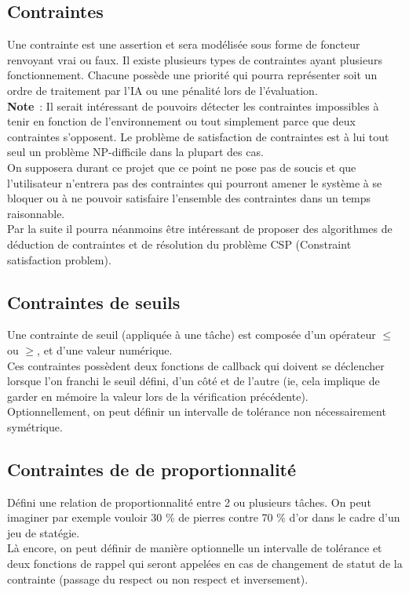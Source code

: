 \subsection*{Contraintes}

Une contrainte est une assertion et sera modélisée sous forme de foncteur renvoyant vrai ou faux.
Il existe plusieurs types de contraintes ayant plusieurs fonctionnement. Chacune possède une priorité qui pourra représenter soit un ordre de traitement par l'IA ou une pénalité lors de l'évaluation. \\

\textbf{Note}~: Il serait intéressant de pouvoirs détecter les contraintes impossibles à tenir en fonction de l'environnement ou tout simplement parce que deux contraintes s'opposent. Le problème de satisfaction de contraintes est à lui tout seul un problème NP-difficile dans la plupart des cas.\\
\indent On supposera durant ce projet que ce point ne pose pas de soucis et que l'utilisateur n'entrera pas des contraintes qui pourront amener le système à se bloquer ou à ne pouvoir satisfaire l'ensemble des contraintes dans un temps raisonnable.\\
\indent Par la suite il pourra néanmoins être intéressant de proposer des algorithmes de déduction de contraintes et de résolution du problème CSP (Constraint satisfaction problem).

\subsection*{Contraintes de seuils}

Une contrainte de seuil (appliquée à une tâche) est composée d'un opérateur $\leq$ ou $\geq$, et d'une valeur numérique.\\
\indent Ces contraintes possèdent deux fonctions de callback qui doivent se déclencher lorsque l'on franchi le seuil défini, d'un côté et de l'autre (ie, cela implique de garder en mémoire la valeur lors de la vérification précédente).\\
\indent Optionnellement, on peut définir un intervalle de tolérance non nécessairement symétrique.

\subsection*{Contraintes de de proportionnalité}

Défini une relation de proportionnalité entre 2 ou plusieurs tâches.
On peut imaginer par exemple vouloir 30 \% de pierres contre 70 \% d'or dans le cadre d'un jeu de statégie.\\
\indent Là encore, on peut définir de manière optionnelle un intervalle de tolérance et deux fonctions de rappel qui seront appelées en cas de changement de statut de la contrainte (passage du respect ou non respect et inversement).

